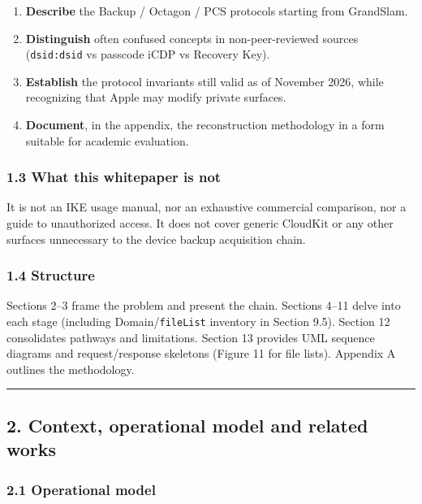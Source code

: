 \documentclass[
  english,
  10pt]{article}
\providecommand{\tightlist}{%
  \setlength{\itemsep}{0pt}\setlength{\parskip}{0pt}}
\begin{document}
\begin{enumerate}
\def\labelenumi{\arabic{enumi}.}
\tightlist
\item
  \textbf{Describe} the Backup / Octagon / PCS protocols starting from
  GrandSlam.
\item
  \textbf{Distinguish} often confused concepts in non-peer-reviewed
  sources (\texttt{dsid:dsid} vs passcode iCDP vs Recovery Key).
\item
  \textbf{Establish} the protocol invariants still valid as of November
  2026, while recognizing that Apple may modify private surfaces.
\item
  \textbf{Document}, in the appendix, the reconstruction methodology in
  a form suitable for academic evaluation.
\end{enumerate}

\subsubsection{1.3 What this whitepaper is
not}\label{what-this-whitepaper-is-not}

It is not an IKE usage manual, nor an exhaustive commercial comparison,
nor a guide to unauthorized access. It does not cover generic CloudKit
or any other surfaces unnecessary to the device backup acquisition
chain.

\subsubsection{1.4 Structure}\label{structure}

Sections 2--3 frame the problem and present the chain. Sections 4--11
delve into each stage (including Domain/\texttt{fileList} inventory in
Section 9.5). Section 12 consolidates pathways and limitations. Section
13 provides UML sequence diagrams and request/response skeletons (Figure
11 for file lists). Appendix A outlines the methodology.

\begin{center}\rule{0.5\linewidth}{0.5pt}\end{center}

\subsection{2. Context, operational model and related
works}\label{context-operational-model-and-related-works}

\subsubsection{2.1 Operational model}\label{operational-model}
\end{document}
